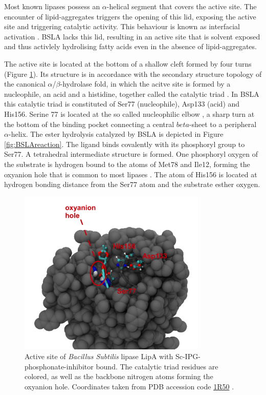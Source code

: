 \documentclass[english, a4paper, 12pt, titlepage, draft]{article}
\newcommand{\PDB}[1]{
    \href{http://pdb.rcsb.org/pdb/explore/explore.do?structureId=#1}{#1}
}
\begin{document}
Most known lipases possess an $\alpha$-helical segment that covers the active site.
The encounter of lipid-aggregates triggers the opening of this lid, exposing the active site and triggering catalytic activity.
This behaviour is known as interfacial activation \cite{alphaBetaHydrolases}.
BSLA lacks this lid, resulting in an active site that is solvent exposed and thus activlely hydrolising fatty acids even in the absence of lipid-aggregates.

The active site is located at the bottom of a shallow cleft formed by four turns (Figure \ref{fig:BSLAactiveSite}).
Its structure is in accordance with the secondary structure topology of the canonical $\alpha$/$\beta$-hydrolase fold, in which the acitve site is formed by a nucleophile, an acid and a histidine, together called the catalytic triad \cite{BSLA_1I6W}.
In BSLA this catalytic triad is constituted of Ser77 (nucleophile), Asp133 (acid) and His156.
Serine 77 is located at the so called nucleophilic elbow \cite{nucleophileElbow}, a sharp turn at the bottom of the binding pocket connecting a central $beta$-sheet to a peripheral $\alpha$-helix.
The ester hydrolysis catalyzed by BSLA is depicted in Figure \ref{fig:BSLAreaction}.
The ligand binds covalently with its phosphoryl group to Ser77.
A tetrahedral intermediate structure is formed.
One phosphoryl oxygen of the substrate is hydrogen bound to the  atoms of Met78 and Ile12, forming the oxyanion hole that is common to most lipases \cite{BSLA_1I6W}.
The  atom of His156 is located at hydrogen bonding distance from the Ser77  atom and the substrate esther oxygen.






\begin{figure}
    \centering
    \includegraphics[width=0.8\textwidth]{figures/BSLA_pocket/BSLA_pocket.pdf}
    \caption{Active site of \textit{Bacillus Subtilis} lipase LipA with Sc-IPG-phosphonate-inhibitor bound.
    The catalytic triad residues are colored, as well as the backbone nitrogen atoms forming the oxyanion hole.
    Coordinates taken from PDB accession code \PDB{1R50}.}
    \label{fig:BSLAactiveSite}
\end{figure} 
\end{document}
